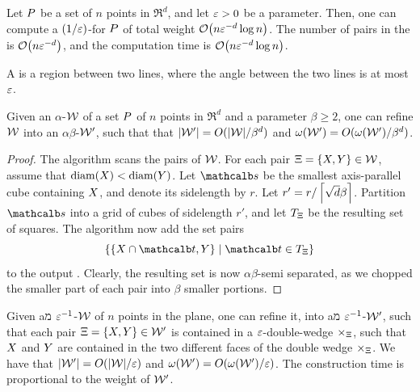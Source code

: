 \documentclass[12pt]{article}%
\begin{document}

\begin{theorem}
    Let $P$ be a set of $n$ points in $\Re^d$, and let $\varepsilon > 0$ be
    a parameter. Then, one can compute a $(1/\varepsilon)$-\SSPD for $P$ of
    total weight $\Of\pth{n \eps^{-d} \log n}$. The number of pairs in
    the \SSPD is $\Of\pth{n \eps^{-d}}$, and the computation time is
    $\Of\pth{ n \eps^{-d} \log n }$.
\end{theorem}

\begin{defn}%
    A  is a region between two lines, where
    the angle between the two lines is at most $\varepsilon$.
\end{defn}

\begin{lemma}
    Given an $\alpha$-\SSPD $\mathcal{W}$ of a set $P$ of $n$ points in
    $\Re^d$ and a parameter $\beta \geq 2$, one can refine $\mathcal{W}$ into
    an $\alpha\beta$-\SSPD $\mathcal{W}'$, such that that
    $|\mathcal{W}'| = O(|\mathcal{W}|/\beta^d)$ and
    $\WeightX{\WS'} = O(\WeightX{\WS'}/\beta^d)$.
\end{lemma}
\begin{proof}
    The algorithm scans the pairs of $\mathcal{W}$. For each pair
    $\Xi = \{ X, Y \} \in \mathcal{W}$, assume that
    $\diameterX{\PSX} < \diameterX{\PSY}$. Let $\sqr$ be the smallest
    axis-parallel cube containing $X$, and denote its sidelength by
    $r$.  Let $r' = r / \left\lceil {\sqrt{d} \beta } \right\rceil$.  Partition $\sqr$
    into a grid of cubes of sidelength $r'$, and let $T_\Xi$ be the
    resulting set of squares. The algorithm now add the set pairs
    \begin{equation*}
        \Set{ \{ \PSX \cap \sqrA, \PSY \} }{ \sqrA \in T_\Pair }
    \end{equation*}
    to the output \SSPD. Clearly, the resulting set is now
    $\alpha\beta$-semi separated, as we chopped the smaller part of
    each pair into $\beta$ smaller portions.
\end{proof}

\SaveContent{\LemmaRefineDWBody}%
{%
   Given aמ $\varepsilon^{-1}$-\SSPD $\mathcal{W}$ of $n$ points in the plane, one
   can refine it, into aמ $\varepsilon^{-1}$-\SSPD $\mathcal{W}'$, such that each
   pair $\Xi = \{ X, Y \} \in \mathcal{W}'$ is contained in a
   $\varepsilon$-double-wedge $\times_\Xi$, such that $X$ and $Y$ are
   contained in the two different faces of the double wedge
   $\times_\Xi$. We have that $|\mathcal{W}'| = O(|\mathcal{W}|/\varepsilon)$ and
   $\WeightX{\WS'} = O(\WeightX{\WS'}/\eps)$. The construction time is
   proportional to the weight of $\mathcal{W}'$.  }
\end{document}
